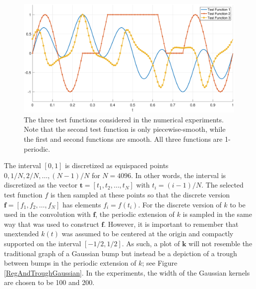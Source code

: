 \documentclass[12pt]{article}
\newcommand{\kcon}{k}
\newcommand{\fcon}{f}
\newcommand{\kdis}{\mathbf{k}}
\newcommand{\fdis}{\mathbf{f}}
\newcommand{\tdis}{\mathbf{t}}
\begin{document}
\begin{figure}
	\centerline{\includegraphics[scale = 0.45]{Figures/TestFunctions1D.eps}}
\caption{The three test functions considered in the numerical experiments. Note that the second test function is only piecewise-smooth, while the first and second functions are smooth. All three functions are 1-periodic.}
\label{TestFunctions}
\end{figure}

The interval $[0,1]$ is discretized as equispaced points $0, 1/N, 2/N, \ldots, (N-1)/N$ for $N = 4096$. In other words, the interval is discretized as the vector $\tdis = [t_1,t_2,\ldots,t_N]$ with $t_i = (i-1)/N$. The selected test function $\fcon$ is then sampled at these points so that the discrete version $\fdis = [\fcon_1,\fcon_2,\ldots,\fcon_N]$ has elements $\fcon_i = \fcon(t_i)$. For the discrete version of $\kcon$ to be used in the convolution with $\fdis$, the periodic extension of $\kcon$ is sampled in the same way that was used to construct $\fdis$. However, it is important to remember that unextended $\kcon(t)$ was assumed to be centered at the origin and compactly supported on the interval $[-1/2,1/2]$. As such, a plot of $\kdis$ will not resemble the traditional graph of a Gaussian bump but instead be a depiction of a trough between bumps in the periodic extension of $\kcon$; see Figure \ref{RegAndTroughGaussian}. In the experiments, the width of the Gaussian kernels are chosen to be 100 and 200.  \par
\end{document}
